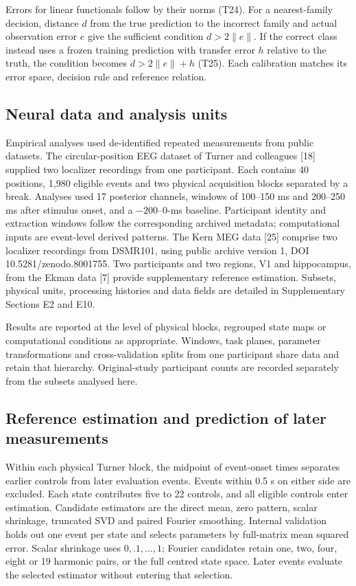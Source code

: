\documentclass[11pt,a4paper]{article}
\begin{document}
Errors for linear functionals follow by their norms (T24). For a
nearest-family decision, distance \(d\) from the true prediction to the
incorrect family and actual observation error \(e\) give the sufficient
condition \(d>2\|e\|\). If the correct class instead uses a frozen
training prediction with transfer error \(h\) relative to the truth, the
condition becomes \(d>2\|e\|+h\) (T25). Each calibration matches its
error space, decision rule and reference relation.

\subsection{Neural data and analysis
units}\label{neural-data-and-analysis-units}

Empirical analyses used de-identified repeated measurements from public
datasets. The circular-position EEG dataset of Turner and colleagues
{[}18{]} supplied two localizer recordings from one participant. Each
contains 40 positions, 1,980 eligible events and two physical
acquisition blocks separated by a break. Analyses used 17 posterior
channels, windows of 100–150 ms and 200–250 ms after stimulus onset,
and a \(-200\)–0-ms baseline. Participant identity and extraction
windows follow the corresponding archived metadata; computational inputs
are event-level derived patterns. The Kern MEG data {[}25{]} comprise
two localizer recordings from DSMR101, using public archive version 1,
DOI 10.5281/zenodo.8001755. Two participants and two regions, V1 and
hippocampus, from the Ekman data {[}7{]} provide supplementary reference
estimation. Subsets, physical units, processing histories and data
fields are detailed in Supplementary Sections E2 and E10.

Results are reported at the level of physical blocks, regrouped state
maps or computational conditions as appropriate. Windows, task planes,
parameter transformations and cross-validation splits from one
participant share data and retain that hierarchy. Original-study
participant counts are recorded separately from the subsets analysed
here.

\subsection{Reference estimation and prediction of later
measurements}\label{reference-estimation-and-prediction-of-later-measurements}

Within each physical Turner block, the midpoint of event-onset times
separates earlier controls from later evaluation events. Events within
0.5 s on either side are excluded. Each state contributes five to 22
controls, and all eligible controls enter estimation. Candidate
estimators are the direct mean, zero pattern, scalar shrinkage,
truncated SVD and paired Fourier smoothing. Internal validation holds
out one event per state and selects parameters by full-matrix mean
squared error. Scalar shrinkage uses \(0,.1,\ldots,1\); Fourier
candidates retain one, two, four, eight or 19 harmonic pairs, or the
full centred state space. Later events evaluate the selected estimator
without entering that selection.
\end{document}
